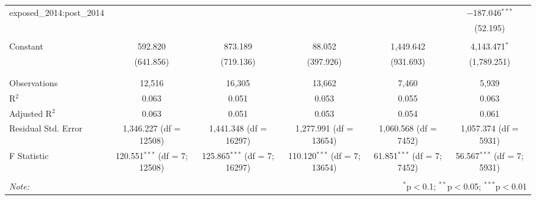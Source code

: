 \begin{table}[!htbp]
\begin{adjustbox}{width=\textwidth}
\begin{tabular}{@{\extracolsep{5pt}}lccccc}
 exposed\_2014:post\_2014 &  &  &  &  & $-$187.046$^{***}$ \\ 
  &  &  &  &  & (52.195) \\ 
  & & & & & \\ 
 Constant & 592.820 & 873.189 & 88.052 & 1,449.642 & 4,143.471$^{*}$ \\ 
  & (641.856) & (719.136) & (397.926) & (931.693) & (1,789.251) \\ 
  & & & & & \\ 
\hline \\[-1.8ex] 
Observations & 12,516 & 16,305 & 13,662 & 7,460 & 5,939 \\ 
R$^{2}$ & 0.063 & 0.051 & 0.053 & 0.055 & 0.063 \\ 
Adjusted R$^{2}$ & 0.063 & 0.051 & 0.053 & 0.054 & 0.061 \\ 
Residual Std. Error & 1,346.227 (df = 12508) & 1,441.348 (df = 16297) & 1,277.991 (df = 13654) & 1,060.568 (df = 7452) & 1,057.374 (df = 5931) \\ 
F Statistic & 120.551$^{***}$ (df = 7; 12508) & 125.865$^{***}$ (df = 7; 16297) & 110.120$^{***}$ (df = 7; 13654) & 61.851$^{***}$ (df = 7; 7452) & 56.567$^{***}$ (df = 7; 5931) \\ 
\hline 
\hline \\[-1.8ex] 
\textit{Note:}  & \multicolumn{5}{r}{$^{*}$p$<$0.1; $^{**}$p$<$0.05; $^{***}$p$<$0.01} \\ 
\end{tabular} 
\end{adjustbox}
\end{table} 
